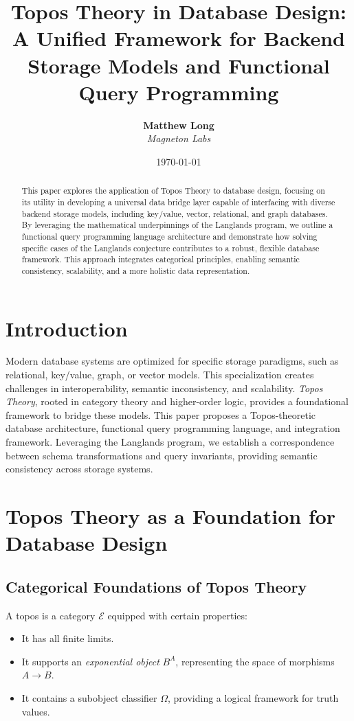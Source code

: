 \documentclass[12pt]{article}
\title{Topos Theory in Database Design: A Unified Framework for Backend Storage Models and Functional Query Programming}
\author{
  \textbf{Matthew Long}\\
  \textit{Magneton Labs}
}
\date{\today}
\begin{document}
\maketitle

\begin{abstract}
This paper explores the application of Topos Theory to database design, focusing on its utility in developing a universal data bridge layer capable of interfacing with diverse backend storage models, including key/value, vector, relational, and graph databases. By leveraging the mathematical underpinnings of the Langlands program, we outline a functional query programming language architecture and demonstrate how solving specific cases of the Langlands conjecture contributes to a robust, flexible database framework. This approach integrates categorical principles, enabling semantic consistency, scalability, and a more holistic data representation.
\end{abstract}

\section{Introduction}
Modern database systems are optimized for specific storage paradigms, such as relational, key/value, graph, or vector models. This specialization creates challenges in interoperability, semantic inconsistency, and scalability. \emph{Topos Theory}, rooted in category theory and higher-order logic, provides a foundational framework to bridge these models. This paper proposes a Topos-theoretic database architecture, functional query programming language, and integration framework. Leveraging the Langlands program, we establish a correspondence between schema transformations and query invariants, providing semantic consistency across storage systems.

\section{Topos Theory as a Foundation for Database Design}

\subsection{Categorical Foundations of Topos Theory}
A topos is a category $\mathcal{E}$ equipped with certain properties:
\begin{itemize}
    \item It has all finite limits.
    \item It supports an \emph{exponential object} $B^A$, representing the space of morphisms $A \to B$.
    \item It contains a subobject classifier $\Omega$, providing a logical framework for truth values.
\end{itemize}
\end{document}
